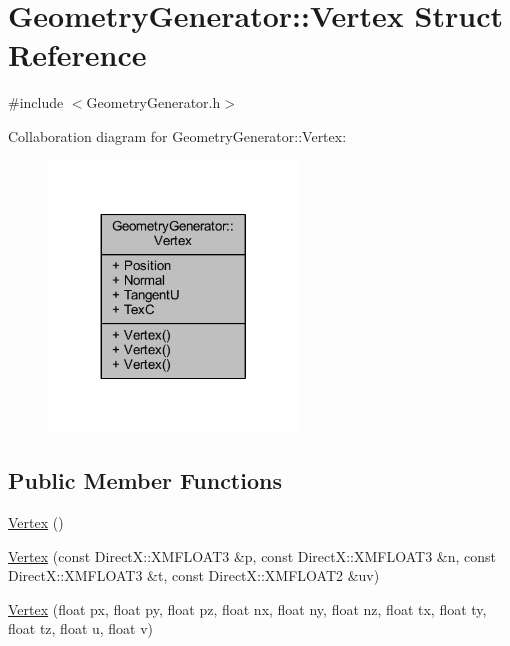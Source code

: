 \hypertarget{struct_geometry_generator_1_1_vertex}{}\section{Geometry\+Generator\+:\+:Vertex Struct Reference}
\label{struct_geometry_generator_1_1_vertex}


{\ttfamily \#include $<$Geometry\+Generator.\+h$>$}



Collaboration diagram for Geometry\+Generator\+:\+:Vertex\+:\nopagebreak
\begin{figure}[H]
\begin{center}
\leavevmode
\includegraphics[width=188pt]{struct_geometry_generator_1_1_vertex__coll__graph}
\end{center}
\end{figure}
\subsection*{Public Member Functions}
\begin{DoxyCompactItemize}
\item 
\hyperlink{struct_geometry_generator_1_1_vertex_aa102c6b22eed04a61aa0021149b198e5_aa102c6b22eed04a61aa0021149b198e5}{Vertex} ()
\item 
\hyperlink{struct_geometry_generator_1_1_vertex_a322406351e5c5e6acda529490c61996b_a322406351e5c5e6acda529490c61996b}{Vertex} (const Direct\+X\+::\+X\+M\+F\+L\+O\+A\+T3 \&p, const Direct\+X\+::\+X\+M\+F\+L\+O\+A\+T3 \&n, const Direct\+X\+::\+X\+M\+F\+L\+O\+A\+T3 \&t, const Direct\+X\+::\+X\+M\+F\+L\+O\+A\+T2 \&uv)
\item 
\hyperlink{struct_geometry_generator_1_1_vertex_a2df7807f385db53fb4bbb6f6f42e8493_a2df7807f385db53fb4bbb6f6f42e8493}{Vertex} (float px, float py, float pz, float nx, float ny, float nz, float tx, float ty, float tz, float u, float v)
\end{DoxyCompactItemize}
